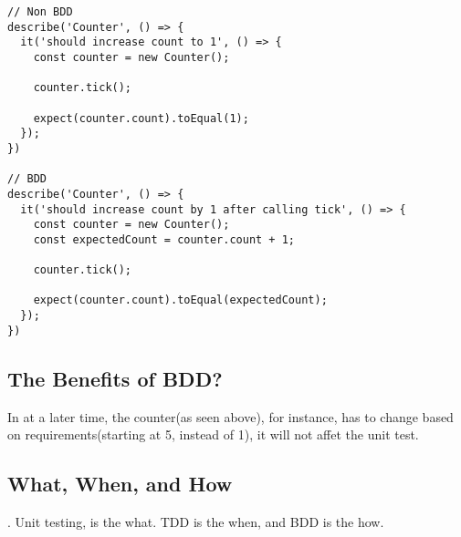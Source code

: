 \begin{lstlisting}
// Non BDD
describe('Counter', () => {
  it('should increase count to 1', () => {
    const counter = new Counter();

    counter.tick();

    expect(counter.count).toEqual(1);
  });
})

// BDD
describe('Counter', () => {
  it('should increase count by 1 after calling tick', () => {
    const counter = new Counter();
    const expectedCount = counter.count + 1;

    counter.tick();

    expect(counter.count).toEqual(expectedCount);
  });
})
\end{lstlisting}

\subsection{ The Benefits of BDD? }
In at a later time, the counter(as seen above), for instance, has to change
based on requirements(starting at 5, instead of 1), it will not affet the unit
test.

\subsection{What, When, and How}.
Unit testing, is the what. TDD is the when, and BDD is the how.

